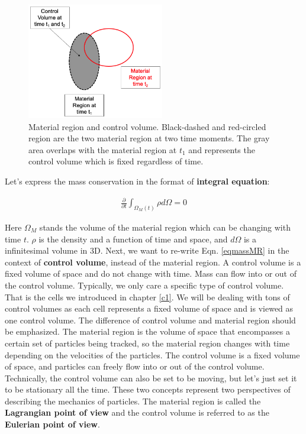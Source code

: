 \documentclass[12pt, letterpaper]{report}
\begin{document}
\begin{figure}[H]
   \centering
   \includegraphics[height=2in]{Fund1.png}
   \caption{Material region and control volume. Black-dashed and red-circled region are the
   two material region at two time moments. The gray area overlaps with the material region at $t_1$
   and represents the control volume which is fixed regardless of time.}
   \label{figfund1}
\end{figure}

Let's express the mass conservation in the format of {\bf integral equation}:

\begin{align}\label{eqmassMR}
   \frac{\partial}{\partial t}\int_{\Omega_M(t)}\rho d\Omega = 0
\end{align}

Here $\Omega_M$ stands the volume of the material region which can be changing with time $t$. $\rho$
is the density and a function of time and space, and $d\Omega$ is a infinitesimal volume in 3D.
Next, we want to re-write Eqn. \ref{eqmassMR} in the context of {\bf control volume}, instead of
the material region. A control volume is a fixed volume of space and
do not change with time. Mass can flow into or out of the control volume. Typically, we only care a
specific type of control volume. That is the cells we introduced in chapter \ref{c1}. We will be
dealing with tons of control volumes as each cell represents a fixed volume of space and is viewed
as one control volume. The difference of control volume and material region should be emphasized.
The material region is the volume of space that encompasses a certain set of particles being
tracked, so the material region changes with time depending on the velocities of the particles. The
control volume is a fixed volume of space, and particles can freely flow into or out of the control
volume. Technically, the control volume can also be set to be moving, but let's just set it to be
stationary all the time. These two concepts represent two perspectives of describing the mechanics
of particles. The material region is called the {\bf Lagrangian point of view} and the control
volume is referred to as the {\bf Eulerian point of view}.
\paraspace
\end{document}
